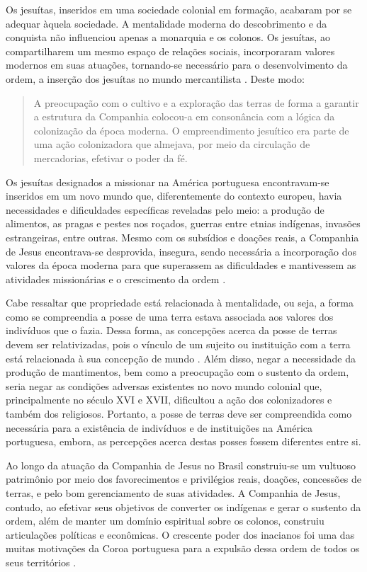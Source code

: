 \begin{refsection}
Os jesuítas, inseridos em uma sociedade colonial em formação, acabaram por se adequar àquela sociedade. A mentalidade moderna do descobrimento e da conquista não influenciou apenas a monarquia e os colonos. Os jesuítas, ao compartilharem um mesmo espaço de relações sociais, incorporaram valores modernos em suas atuações, tornando-se necessário para o desenvolvimento da ordem, a inserção dos jesuítas no mundo mercantilista \cite[p.~239]{Assuncao2004}. Deste modo:

    \begin{quote}
    A preocupação com o cultivo e a exploração das terras de forma a garantir a estrutura da Companhia colocou-a em consonância com a lógica da colonização da época moderna. O empreendimento jesuítico era parte de uma ação colonizadora que almejava, por meio da circulação de mercadorias, efetivar o poder da fé. \cite[p.~251]{Assuncao2004}         
    \end{quote}

Os jesuítas designados a missionar na América portuguesa encontravam-se inseridos em um novo mundo que, diferentemente do contexto europeu, havia necessidades e dificuldades específicas reveladas pelo meio: a produção de alimentos, as pragas e pestes nos roçados, guerras entre etnias indígenas, invasões estrangeiras, entre outras. Mesmo com os subsídios e doações reais, a Companhia de Jesus encontrava-se desprovida, insegura, sendo necessária a incorporação dos valores da época moderna para que superassem as dificuldades e mantivessem as atividades missionárias e o crescimento da ordem \cite[p.~151]{Assuncao2004}. 

Cabe ressaltar que propriedade está relacionada à mentalidade, ou seja, a forma como se compreendia a posse de uma terra estava associada aos valores dos indivíduos que o fazia. Dessa forma, as concepções acerca da posse de terras devem ser relativizadas, pois o vínculo de um sujeito ou instituição com a terra está relacionada à sua concepção de mundo \cite[p.~30--31]{Grossi2006}. Além disso, negar a necessidade da produção de mantimentos, bem como a preocupação com o sustento da ordem, seria negar as condições adversas existentes no novo mundo colonial que, principalmente no século XVI e XVII, dificultou a ação dos colonizadores e também dos religiosos. Portanto, a posse de terras deve ser compreendida como necessária para a existência de indivíduos e de instituições na América portuguesa, embora, as percepções acerca destas posses fossem diferentes entre si.  

Ao longo da atuação da Companhia de Jesus no Brasil construiu-se um vultuoso patrimônio por meio dos favorecimentos e privilégios reais, doações, concessões de terras, e pelo bom gerenciamento de suas atividades. A Companhia de Jesus, contudo, ao efetivar seus objetivos de converter os indígenas e gerar o sustento da ordem, além de manter um domínio espiritual sobre os colonos, construiu articulações políticas e econômicas. O crescente poder dos inacianos foi uma das muitas motivações da Coroa portuguesa para a expulsão dessa ordem de todos os seus territórios \cite{Couto1990}.




\end{refsection}
